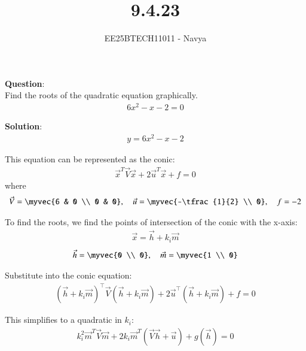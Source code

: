 \documentclass[journal]{IEEEtran}
\begin{document}

\vspace{3cm}

\title{9.4.23}
\author{EE25BTECH11011 - Navya}
{\let\newpage\relax\maketitle}

\renewcommand{\thefigure}{\theenumi}
\renewcommand{\thetable}{\theenumi}
\setlength{\intextsep}{10pt} %
\textbf{Question}:\\
Find the roots of the quadratic equation graphically.
\begin{align}
6x^2 - x - 2 = 0
\end{align}


\textbf{Solution}:\\
\begin{align}
y = 6x^2 - x - 2
\end{align}

This equation can be represented as the conic:
\begin{align}
\vec{x}^T\vec{V}\vec{x} + 2\vec{u}^T\vec{x} + f = 0
\end{align}
where
\begin{align}
\vec{V} = \myvec{6 & 0 \\ 0 & 0}, \quad 
\vec{u} = \myvec{-\tfrac{1}{2} \\ 0}, \quad 
f = -2
\end{align}

To find the roots, we find the points of intersection of the conic with the x-axis:
\begin{align}
\vec{x} = \vec{h} + k_i\vec{m}    
\end{align}
\begin{align}
\vec{h}=\myvec{0 \\ 0}, \quad \vec{m} = \myvec{1 \\ 0}
\end{align}

Substitute into the conic equation:
\begin{align}
(\vec{h} + k_i \vec{m})^{\top} \vec{V} (\vec{h} + k_i \vec{m}) 
+ 2\vec{u}^{\top} (\vec{h} + k_i \vec{m}) + f = 0
\end{align}

This simplifies to a quadratic in \( k_i \):
\begin{align}
k_i^2 \vec{m}^T \vec{V} \vec{m} 
+ 2k_i \vec{m}^T (\vec{V}\vec{h} + \vec{u}) 
+ g(\vec{h}) = 0
\end{align}
\end{document}
